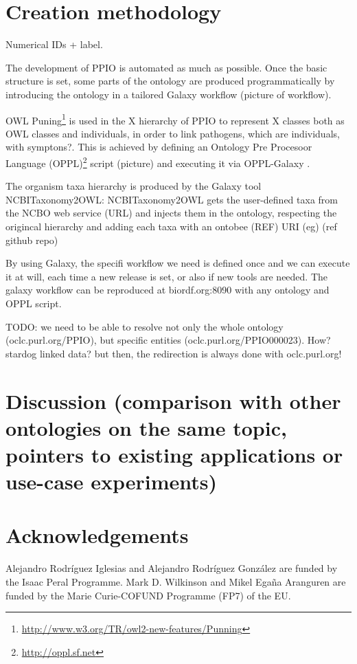 \documentclass[sw]{iosart2c}
\newcommand{\myurl}[1]{\footnote{\url{#1}}}
\begin{document}
\section{Creation methodology}

Numerical IDs + label.

The development of PPIO is automated as much as possible. Once the basic structure is set, some parts of the ontology are produced programmatically by introducing the ontology in a tailored Galaxy \cite{galaxy} workflow  (picture of workflow). 

OWL Puning\myurl{http://www.w3.org/TR/owl2-new-features/Punning} is used in the X hierarchy of PPIO to represent X classes both as OWL classes and individuals, in order to link pathogens, which are individuals, with symptons?. This is achieved by defining an Ontology Pre Procesoor Language (OPPL)\myurl{http://oppl.sf.net} script (picture) and executing it via OPPL-Galaxy \cite{OPPL-Galaxy-JBMS}.

The organism taxa hierarchy is produced by the Galaxy tool NCBITaxonomy2OWL: NCBITaxonomy2OWL gets the user-defined taxa from the NCBO web service (URL) and injects them in the ontology, respecting the origincal hierarchy and adding each taxa with an ontobee (REF) URI (eg) (ref github repo)

By using Galaxy, the specifi workflow we need is defined once and we can execute it at will, each time a new release is set, or also if new tools are needed. The galaxy workflow can be reproduced at biordf.org:8090 with any ontology and OPPL script.

TODO: we need to be able to resolve not only the whole ontology (oclc.purl.org/PPIO), but specific entities (oclc.purl.org/PPIO000023). How? stardog linked data? but then, the redirection is always done with oclc.purl.org!



\section{Discussion (comparison with other ontologies on the same topic, pointers to existing applications or use-case experiments)}

\section*{Acknowledgements}
Alejandro Rodr\'iguez Iglesias and Alejandro Rodr\'iguez Gonz\'alez are funded by the Isaac Peral Programme. Mark D. Wilkinson and Mikel Ega\~na Aranguren are funded by the Marie Curie-COFUND Programme (FP7) of the EU.
\end{document}
